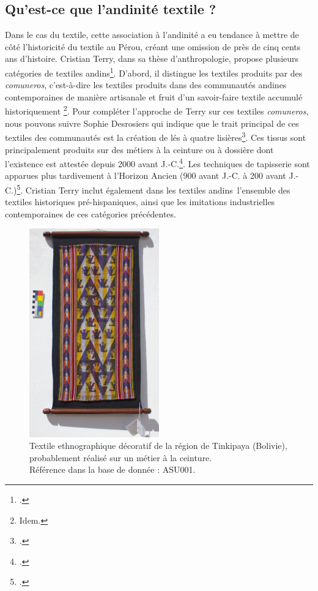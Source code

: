 \subsection{Qu'est-ce que l'\og andinité \fg \:textile ?}

Dans le cas du textile, cette association à l'andinité a eu tendance à mettre de côté l'historicité du textile au Pérou, créant une omission de près de cinq cents ans d'histoire. Cristian Terry, dans sa thèse d'anthropologie, propose plusieurs catégories de textiles \og andins\fg\footcite[p.~154]{terryTisserValeurAu2019}. D'abord, il distingue les textiles produits par des \textit{comuneros}, c'est-à-dire les textiles produits dans des communautés andines contemporaines de manière artisanale et fruit d'un \og savoir-faire textile accumulé historiquement \fg\footnote{Idem.}. Pour compléter l'approche de Terry sur ces textiles \textit{comuneros}, nous pouvons suivre Sophie Desrosiers qui indique que le trait principal de ces textiles des communautés est la création de lés à quatre lisières\footcite[p.~267 et communication personnelle.]{desrosiersTechniquesTissageOntelles2010}. Ces tissus sont principalement produits sur des métiers à la ceinture ou à dossière dont l'existence est attestée depuis 2000 avant J.-C.\footcite[p.~190]{cousinRobeFemmeOrigine2016}. Les techniques de tapisserie sont apparues plus tardivement à l'Horizon Ancien (900 avant J.-C. à 200 avant J.-C.)\footcite[p.~58]{desrosiersMatieresPremieresSavoirs2018}.
Cristian Terry inclut également dans les textiles \og andins\fg\ \:l'ensemble des textiles historiques pré-hispaniques, ainsi que les imitations industrielles contemporaines de ces catégories précédentes.

\begin{figure}
    \centering
    \includegraphics[width=0.5\textwidth]{../images/ASU001.jpg}
    \caption{Textile ethnographique décoratif de la région de Tinkipaya (Bolivie), probablement réalisé sur un métier à la ceinture. \\ Référence dans la base de donnée : ASU001.}
    \label{fig:ASU001}
\end{figure}

